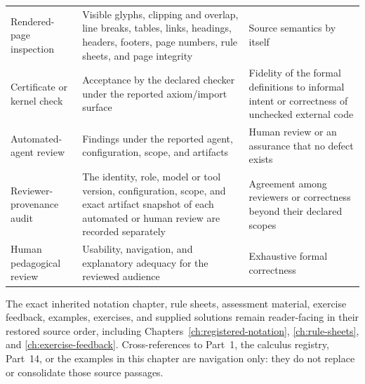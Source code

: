 \begin{landscape}
\begin{longtable}{@{}p{1.40in}p{2.35in}p{3.35in}@{}}
Rendered-page inspection & Visible glyphs, clipping and overlap, line breaks,
tables, links, headings, headers, footers, page numbers, rule sheets, and page
integrity & Source semantics by itself \\ \addlinespace
Certificate or kernel check & Acceptance by the declared checker under the
reported axiom/import surface & Fidelity of the formal definitions to informal
intent or correctness of unchecked external code \\ \addlinespace
Automated-agent review & Findings under the reported agent, configuration,
scope, and artifacts & Human review or an assurance that no defect exists \\
\addlinespace
Reviewer-provenance audit & The identity, role, model or tool version,
configuration, scope, and exact artifact snapshot of each automated or human
review are recorded separately & Agreement among reviewers or correctness
beyond their declared scopes \\ \addlinespace
Human pedagogical review & Usability, navigation, and explanatory adequacy for
the reviewed audience & Exhaustive formal correctness \\ \bottomrule
\end{longtable}
\endgroup
\end{landscape}

The exact inherited notation chapter, rule sheets, assessment material,
exercise feedback, examples, exercises, and supplied solutions remain
reader-facing in their restored source order, including
Chapters~\ref{ch:registered-notation}, \ref{ch:rule-sheets}, and
\ref{ch:exercise-feedback}.  Cross-references to Part~1, the calculus registry,
Part~14, or the examples in this chapter are navigation only: they do not
replace or consolidate those source passages.
